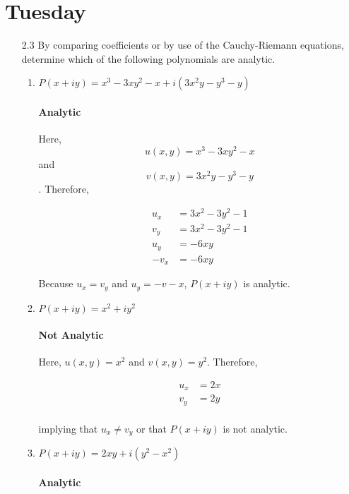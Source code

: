 \documentclass[11pt]{article}
\begin{document}
\section{Tuesday}
\begin{enumerate}
	\item[2.3] By comparing coefficients or by use of the Cauchy-Riemann equations, determine which of the following polynomials are analytic.
	
	\begin{enumerate}
		\item $P(x + iy) = x^3 - 3xy^2 - x + i(3x^2y - y^3 - y)$
		
		\paragraph{Analytic}
		
		Here, 
		\[u(x, y) = x^3 - 3xy^2 - x\] and
		\[v(x, y) = 3x^2y - y^3 - y\]. Therefore,
		
		\[\begin{aligned}
		u_x &= 3x^2 - 3y^2 - 1 \\
		v_y &= 3x^2 - 3y^2 - 1 \\		
		u_y &= -6xy \\
		-v_x &= -6xy
		\end{aligned}		
		\]
		
		Because $u_x = v_y$ and $u_y = -v-x$, $P(x + iy)$ is analytic.
		
		\item $P(x + iy) = x^2 + iy^2$
		
		\paragraph{Not Analytic}
		
		Here, $u(x, y) = x^2$ and $v(x, y) = y^2$. Therefore, 
		
		\[\begin{aligned}
		u_x &= 2x \\
		v_y &= 2y \\ 
		\end{aligned}\]
		
		implying that $u_x \neq v_y$ or that $P(x + iy)$ is not analytic.
						
		\item $P(x + iy) = 2xy + i(y^2 - x^2)$
		
		\paragraph{Analytic}
		

\end{enumerate}
\end{enumerate}
\end{document}
